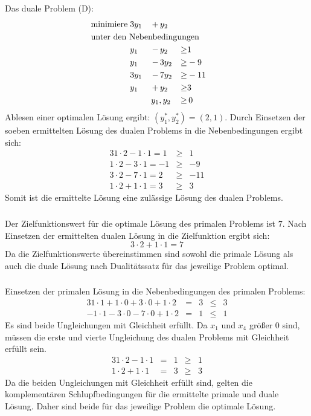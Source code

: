 \documentclass[10pt,a4paper,oneside,ngerman,numbers=noenddot]{scrartcl}
\begin{document}
	\subsection{} %
		Das duale Problem (D):
		\begin{alignat*}{3}
			\text{minimiere}\; & 3y_{1} \,&+&\, y_{2} && \\
			\multicolumn{6}{l}{\text{unter den Nebenbedingungen}} && \\
			\;& y_{1} \,&-&\, y_{2} &\geq & 1 \\ 			
			\;& y_{1} \,&-&\, 3y_{2} &\geq & -9 \\
			\;& 3y_{1} \,&-&\, 7y_{2} &\geq & -11 \\ 						
			\;& y_{1} \,&+&\, y_{2} &\geq & 3 \\ 			
			\multicolumn{4}{r}{$y_{1}, y_{2}$} \,&\geq &\, 0
		\end{alignat*}
		Ablesen einer optimalen Lösung ergibt: $(y_{1}^{*}, y_{2}^{*}) = (2, 1)$.
		Durch Einsetzen der soeben ermittelten Lösung des dualen Problems in die Nebenbedingungen ergibt sich:
		\begin{alignat*}{3}
			1 \cdot 2 - 1 \cdot 1 = 1 &\geq & 1 \\
			1 \cdot 2 - 3 \cdot 1 = -1 &\geq & -9 \\
			3 \cdot 2 - 7 \cdot 1 = 2 &\geq & -11 \\
			1 \cdot 2 + 1 \cdot 1 = 3 &\geq & 3
		\end{alignat*}
		Somit ist die ermittelte Lösung eine zulässige Lösung des dualen Problems.
		\subsubsection{} %
			Der Zielfunktionswert für die optimale Lösung des primalen Problems ist $7$. Nach Einsetzen der ermittelten dualen Lösung in die Zielfunktion ergibt sich:
			\[
				3 \cdot 2 + 1 \cdot 1 = 7
			\]
			Da die Zielfunktionswerte übereinstimmen sind sowohl die primale Lösung als auch die duale Lösung nach Dualitätssatz für das jeweilige Problem optimal.
		\subsubsection{} %
			Einsetzen der primalen Lösung in die Nebenbedingungen des primalen Problems:
			\begin{alignat*}{3}
				1 \cdot 1 + 1 \cdot 0 + 3 \cdot 0 + 1 \cdot 2 &=& 3 &\leq & 3 \\
				-1 \cdot 1 - 3 \cdot 0 - 7 \cdot 0 + 1 \cdot 2 &=& 1 &\leq & 1 
			\end{alignat*}
			Es sind beide Ungleichungen mit Gleichheit erfüllt. Da $x_{1}$ und $x_{4}$ größer $0$ sind, müssen die erste und vierte Ungleichung des dualen Problems mit Gleichheit erfüllt sein.
			\begin{alignat*}{3}
				1 \cdot 2 - 1 \cdot 1 &=& 1 &\geq & 1 \\
				1 \cdot 2 + 1 \cdot 1 &=& 3 &\geq & 3
			\end{alignat*}
			Da die beiden Ungleichungen mit Gleichheit erfüllt sind, gelten die komplementären Schlupfbedingungen für die ermittelte primale und duale Lösung. Daher sind beide für das jeweilige Problem die optimale Lösung.
\end{document}
